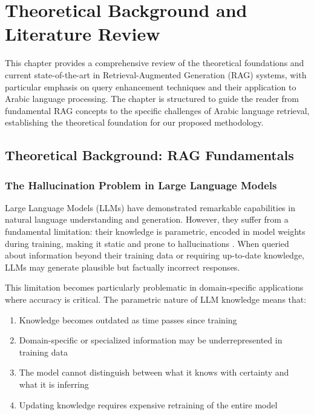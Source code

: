 \chapter{Theoretical Background and Literature Review}

This chapter provides a comprehensive review of the theoretical foundations and current state-of-the-art in Retrieval-Augmented Generation (RAG) systems, with particular emphasis on query enhancement techniques and their application to Arabic language processing. The chapter is structured to guide the reader from fundamental RAG concepts to the specific challenges of Arabic language retrieval, establishing the theoretical foundation for our proposed methodology.

\section{Theoretical Background: RAG Fundamentals}

\subsection{The Hallucination Problem in Large Language Models}

Large Language Models (LLMs) have demonstrated remarkable capabilities in natural language understanding and generation. However, they suffer from a fundamental limitation: their knowledge is parametric, encoded in model weights during training, making it static and prone to hallucinations \cite{song_2024_a}. When queried about information beyond their training data or requiring up-to-date knowledge, LLMs may generate plausible but factually incorrect responses.

This limitation becomes particularly problematic in domain-specific applications where accuracy is critical. The parametric nature of LLM knowledge means that:
\begin{enumerate}
    \item Knowledge becomes outdated as time passes since training
    \item Domain-specific or specialized information may be underrepresented in training data
    \item The model cannot distinguish between what it knows with certainty and what it is inferring
    \item Updating knowledge requires expensive retraining of the entire model
\end{enumerate}

